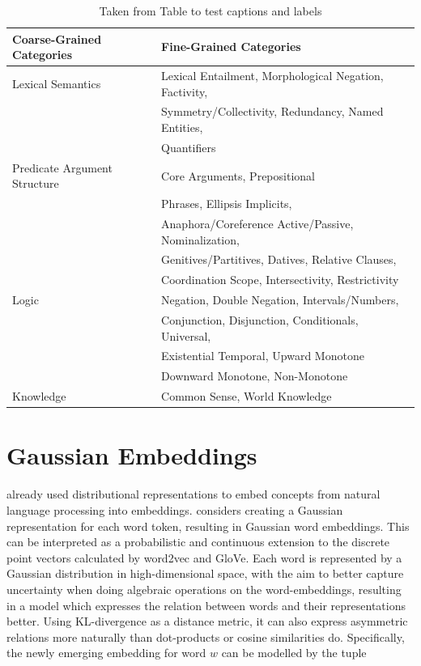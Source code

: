 \documentclass[a4paper,12pt,twoside,openright]{report}
\begin{document}
\begin{table}[h!]
\centering
\begin{tabular}{l l} 
 \hline
 Coarse-Grained Categories & Fine-Grained Categories \\ [0.5ex] 
 \hline
 Lexical Semantics & Lexical Entailment, Morphological Negation, Factivity, \\
&  Symmetry/Collectivity, Redundancy, Named Entities, \\
& Quantifiers \\ 
Predicate Argument Structure & Core Arguments, Prepositional \\ & Phrases, Ellipsis \/ Implicits, \\
& Anaphora/Coreference Active/Passive, Nominalization, \\
& Genitives/Partitives, Datives, Relative Clauses, \\
& Coordination Scope, Intersectivity, Restrictivity \\
Logic & Negation, Double Negation, Intervals/Numbers, \\
& Conjunction, Disjunction, Conditionals, Universal, \\
& Existential Temporal, Upward Monotone \\
& Downward Monotone, Non-Monotone \\
Knowledge & Common Sense, World Knowledge \\ [1ex] 
\hline
\end{tabular}
\caption{Taken from \cite{wang19} Table to test captions and labels}
\label{table:1}
\end{table}

\section{Gaussian Embeddings}\label{appendix:GaussianEmbeddings}

\cite{bengio06} already used distributional representations to embed concepts from natural language processing into embeddings.
\cite{vilnis14} considers creating a Gaussian representation for each word token, resulting in Gaussian word embeddings.
This can be interpreted as a probabilistic and continuous extension to the discrete point vectors calculated by word2vec and GloVe.
Each word is represented by a Gaussian distribution in high-dimensional space, with the aim to better capture uncertainty when doing algebraic operations on the word-embeddings, resulting in a model which expresses the relation between words and their representations better.
Using KL-divergence as a distance metric, it can also express asymmetric relations more naturally than dot-products or cosine similarities do.  
Specifically, the newly emerging embedding for word $w$ can be modelled by the tuple 
\end{document}

